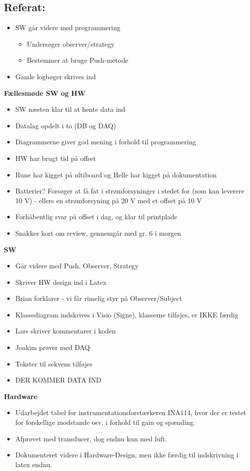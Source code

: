 \documentclass[a4paper,11pt,oneside]{memoir}
\newcommand{\R}{\ensuremath{\mathbb{R}}}
\begin{document}
\subsection{Referat:}
\begin{itemize}
\item SW går videre med programmering 
\begin{itemize}
\item Undersøger observer/strategy
\item Bestemmer at bruge Push-metode
\end{itemize}
\item Gamle logbøger skrives ind 
\end{itemize}
\textbf{Fællesmøde SW og HW}
\begin{itemize}
\item SW næsten klar til at hente data ind 
\item Datalag opdelt i to (DB og DAQ)
\item Diagrammerne giver god mening i forhold til programmering 
\item HW har brugt tid på offset 
\item Rune har kigget på ultiboard og Helle har kigget på dokumentation 
\item Batterier? Forsøger at få fat i strømforsyninger i stedet for (som kan leverere 10 V) - ellers en strømforsyning på 20 V med et offset på 10 V
\item Forhåbentlig svar på offset i dag, og klar til printplade
\item Snakker kort om review, gennemgår med gr. 6 i morgen
\end{itemize}
\textbf{SW}
\begin{itemize}
\item Går videre med Push, Observer, Strategy
\item Skriver HW design ind i Latex
\item Brian forklarer - vi får rimelig styr på Observer/Subject
\item Klassediagram indskrives i Visio (Signe), klasserne tilføjes, er IKKE færdig
\item Lars skriver kommentarer i koden
\item Joakim prøver med DAQ
\item Tekster til sekvens tilføjes
\item DER KOMMER DATA IND
\end{itemize}
\textbf{Hardware}
\begin{itemize}
\item Udarbejdet tabel for instrumentationsforstærkeren INA114, hvor der er testet for forskellige modstande osv. i forhold til gain og spænding. 
\item Afprøvet med transducer, dog endnu kun med luft.
\item Dokumenteret videre i Hardware-Design, men ikke færdig til indskrivning i latex endnu.
\end{itemize}


\newpage


\end{document}
